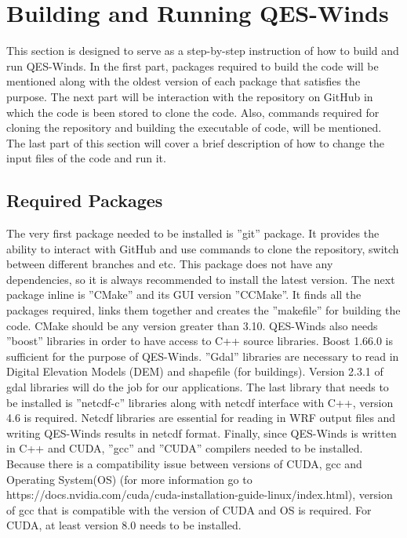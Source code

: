 \section{Building and Running QES-Winds}

This section is designed to serve as a step-by-step instruction of how to build and run QES-Winds. In the first part, packages required to build the code will be mentioned along with the oldest version of each package that satisfies the purpose. The next part will be interaction with the repository on GitHub in which the code is been stored to clone the code. Also, commands required for cloning the repository and building the executable of code, will be mentioned. The last part of this section will cover a brief description of how to change the input files of the code and run it.

\subsection{Required Packages}

The very first package needed to be installed is ''git'' package. It provides the ability to interact with GitHub and use commands to clone the repository, switch between different branches and etc. This package does not have any dependencies, so it is always recommended to install the latest version. The next package inline is ''CMake'' and its GUI version ''CCMake''. It finds all the packages required, links them together and creates the ''makefile'' for building the code. CMake should be any version greater than 3.10.
QES-Winds also needs ''boost'' libraries in order to have access to C++ source libraries. Boost 1.66.0 is sufficient for the purpose of QES-Winds. ''Gdal'' libraries are necessary to read in Digital Elevation Models (DEM) and shapefile (for buildings). Version 2.3.1 of gdal libraries will do the job for our applications. The last library that needs to be installed is ''netcdf-c'' libraries along with netcdf interface with C++, version 4.6 is required. Netcdf libraries are essential for reading in WRF output files and writing QES-Winds results in netcdf format.
Finally, since QES-Winds is written in C++ and CUDA, ''gcc'' and ''CUDA'' compilers needed to be installed. Because there is a compatibility issue between versions of CUDA, gcc and Operating System(OS) (for more information go to https://docs.nvidia.com/cuda/cuda-installation-guide-linux/index.html), version of gcc that is compatible with the version of CUDA and OS is required. For CUDA, at least version 8.0 needs to be installed.

